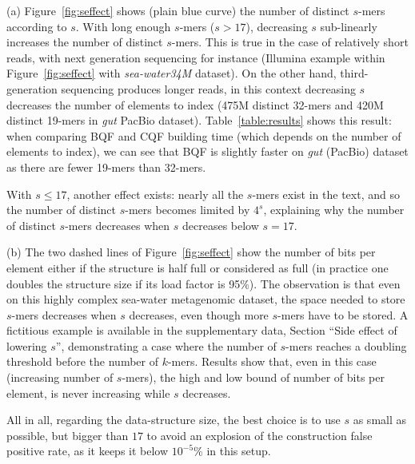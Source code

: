 \noindent(a) Figure~\ref{fig:seffect} shows (plain blue curve) the number of distinct $s$-mers according to $s$. With long enough $s$-mers ($s>17$), decreasing $s$ sub-linearly increases the number of distinct $s$-mers. This is true in the case of relatively short reads, with next generation sequencing for instance (Illumina example within Figure~\ref{fig:seffect} with \textit{sea-water34M} dataset). On the other hand, third-generation sequencing produces longer reads, in this context decreasing $s$ decreases the number of elements to index (475M distinct 32-mers and 420M distinct 19-mers in \textit{gut} PacBio dataset). Table~\ref{table:results} shows this result: when comparing BQF and CQF building time (which depends on the number of elements to index), we can see that BQF is slightly faster on \textit{gut} (PacBio) dataset as there are fewer 19-mers than 32-mers.

With $s\leq 17$, another effect exists: nearly all the $s$-mers exist in the text, and so the number of distinct $s$-mers becomes limited by $4^s$, explaining why the number of distinct $s$-mers decreases when $s$ decreases below $s=17$.
\medskip

\noindent(b) The two dashed lines of Figure~\ref{fig:seffect} show the number of bits per element either if the structure is half full or considered as full (in practice one doubles the structure size if its load factor is 95\%). The observation is that even on this highly complex sea-water metagenomic dataset, the space needed to store $s$-mers decreases when $s$ decreases, even though more $s$-mers have to be stored. A fictitious example is available in the supplementary data, Section ``Side effect of lowering $s$'', demonstrating a case where the number of $s$-mers reaches a doubling threshold before the number of $k$-mers. Results show that, even in this case (increasing number of $s$-mers), the high and low bound of number of bits per element, is never increasing while $s$ decreases.

All in all, regarding the data-structure size, the best choice is to use $s$ as small as possible, but bigger than $17$ to avoid an explosion of the construction false positive rate, as it keeps it below $10^{-5}$\% in this setup. 

